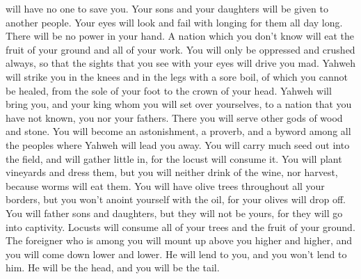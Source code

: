 will have no one to save you.  Your sons and your
daughters will be given to another people. Your eyes will look and fail
with longing for them all day long. There will be no power in your hand.
 A nation which you don't know will eat the fruit of your
ground and all of your work. You will only be oppressed and crushed
always,  so that the sights that you see with your eyes
will drive you mad.  Yahweh will strike you in the knees
and in the legs with a sore boil, of which you cannot be healed, from
the sole of your foot to the crown of your head.  Yahweh
will bring you, and your king whom you will set over yourselves, to a
nation that you have not known, you nor your fathers. There you will
serve other gods of wood and stone.  You will become an
astonishment, a proverb, and a byword among all the peoples where Yahweh
will lead you away.  You will carry much seed out into
the field, and will gather little in, for the locust will consume it.
 You will plant vineyards and dress them, but you will
neither drink of the wine, nor harvest, because worms will eat them.
 You will have olive trees throughout all your borders,
but you won't anoint yourself with the oil, for your olives will drop
off.  You will father sons and daughters, but they will
not be yours, for they will go into captivity.  Locusts
will consume all of your trees and the fruit of your ground.
 The foreigner who is among you will mount up above you
higher and higher, and you will come down lower and lower.
 He will lend to you, and you won't lend to him. He will
be the head, and you will be the tail.

